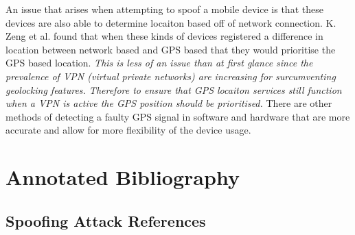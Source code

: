 An issue that arises when attempting to spoof a mobile device is that these devices are also able to determine locaiton based off of
network connection. 
K. Zeng et al. \cite{RN9} found that when these kinds of devices registered a difference in location between network based and GPS based
that they would prioritise the GPS based location. \emph{This is less of an issue than at first glance since the prevalence of VPN (virtual private networks)
are increasing for surcumventing geolocking features. Therefore to ensure that GPS locaiton services still function when a VPN is active
the GPS position should be prioritised.} There are other methods of detecting a faulty GPS signal in software and hardware that are
more accurate and allow for more flexibility of the device usage. 

\bigskip

\section{Annotated Bibliography}
\subsection{Spoofing Attack References}

